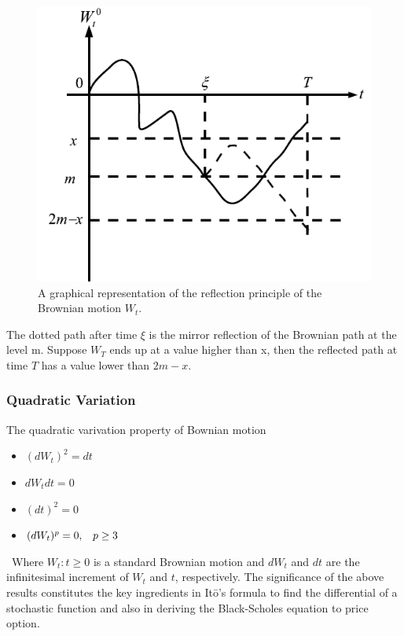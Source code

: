 \begin{figure}[htp]
	\begin{center}
		\includegraphics[scale=0.6]{figure5}
	\end{center}
	\label{reffig5}
	\caption{A graphical representation of the reflection principle of the Brownian motion $W_t$.}
\end{figure}

\newpage 
The dotted path after time $\xi$ is the mirror reflection of the Brownian path at the level m.
Suppose $W_T$ ends up at a value higher than x, then the reflected path at time $T$ has a value
lower than $2m − x$.

\subsubsection*{Quadratic Variation}

The quadratic varivation property of Bownian motion
\begin{itemize}
	\item $(dW_t)^2=dt$
	\item $dW_tdt=0$
	\item $(dt)^2=0$
	\item $(dW_t)^p=0, \hspace{0.3cm}p\geq3$
\end{itemize}\
Where ${W_t:t\geq 0}$ is a standard Brownian motion and $dW_t$ and $dt$ are the infinitesimal increment of $W_t$ and $t$, respectively. The significance of the above results constitutes the key ingredients in It\=o's formula to find the differential of a stochastic function and also in deriving the Black-Scholes equation to price option.
